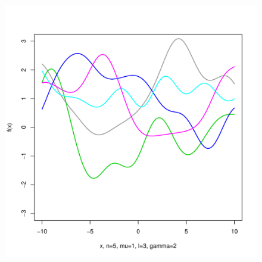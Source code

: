 \documentclass[12pt,letterpaper]{article}
\begin{document}
\begin{figure}
\begin{center}
\includegraphics[scale=0.2]{hw321/n5-m1-l3-g4.pdf}
\end{center}
\end{figure}
\end{document}
